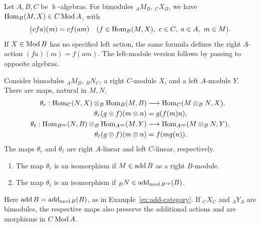\begin{advanced}
Let $A,B,C$ be $\Bbbk$-algebras.
For bimodules ${}_AM_B$, ${}_CX_B$, we have $\operatorname{Hom}\nolimits_B(M,X)\in C\operatorname{\mathrm{Mod}} A$, with
\begin{equation}\label{eq:general-tensor-dual-actions}
(cfa)(m)=cf(am)
\quad(f\in\operatorname{Hom}\nolimits_B(M,X),\ c\in C,\ a\in A,\ m\in M).
\end{equation}
If $X\in\operatorname{\mathrm{Mod}} B$ has no specified left action, the same formula defines the right $A$-action $(fa)(m)=f(am)$.
The left-module version follows by passing to opposite algebras.

\begin{proposition}\label{prop:tensor-duals}
Consider bimodules ${}_AM_B$, ${}_BN_C$, a right $C$-module $X$, and a left $A$-module $Y$.
There are maps, natural in $M,N$,
\begin{equation}\label{eq:general-tensor-duals}
\begin{aligned}
\theta_r:\operatorname{Hom}\nolimits_C(N,X)\otimes_B\operatorname{Hom}\nolimits_B(M,B)
&\longrightarrow\operatorname{Hom}\nolimits_C(M\otimes_B N,X),\\
\theta_r(g\otimes f)(m\otimes n)&=g(f(m)n),\\
\theta_\ell:\operatorname{Hom}\nolimits_{B^{\mathrm{op}}}(N,B)\otimes_B\operatorname{Hom}\nolimits_{A^{\mathrm{op}}}(M,Y)
&\longrightarrow\operatorname{Hom}\nolimits_{A^{\mathrm{op}}}(M\otimes_B N,Y),\\
\theta_\ell(g\otimes f)(m\otimes n)&=f(mg(n)).
\end{aligned}
\end{equation}
The maps $\theta_r$ and $\theta_\ell$ are right $A$-linear and left $C$-linear, respectively.
\begin{enumerate}
\item The map $\theta_r$ is an isomorphism if $M\in\operatorname{add} B$ as a right $B$-module.
\item The map $\theta_\ell$ is an isomorphism if ${}_BN\in\operatorname{add}_{\operatorname{\mathrm{mod}} B^{\mathrm{op}}}(B)$.
\end{enumerate}
Here $\operatorname{add} B=\operatorname{add}_{\operatorname{\mathrm{mod}} B}(B)$, as in Example~\ref{ex:add-category}.
If ${}_CX_C$ and ${}_AY_A$ are bimodules, the respective maps also preserve the additional actions and are morphisms in $C\operatorname{\mathrm{Mod}} A$.
\end{proposition}


\end{advanced}
